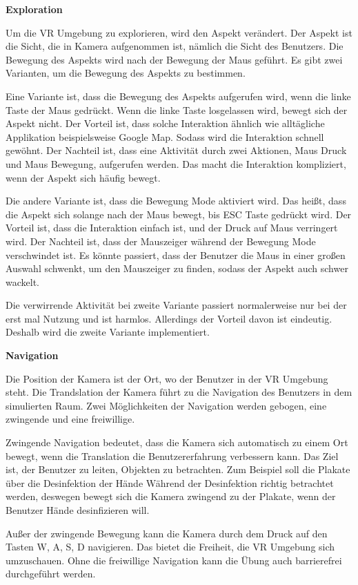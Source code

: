   \textbf{Exploration}
  
  Um die VR Umgebung zu explorieren, wird den Aspekt verändert. Der Aspekt ist die Sicht, die in Kamera aufgenommen ist, nämlich die Sicht des Benutzers. Die Bewegung des Aspekts wird nach der Bewegung der Maus geführt. Es gibt zwei Varianten, um die Bewegung des Aspekts zu bestimmen.
  
  Eine Variante ist, dass die Bewegung des Aspekts aufgerufen wird, wenn die linke Taste der Maus gedrückt. Wenn die linke Taste losgelassen wird, bewegt sich der Aspekt nicht. Der Vorteil ist, dass solche Interaktion ähnlich wie alltägliche Applikation beispielsweise Google Map. Sodass wird die Interaktion schnell gewöhnt. Der Nachteil ist, dass eine Aktivität durch zwei Aktionen, Maus Druck und Maus Bewegung, aufgerufen werden. Das macht die Interaktion kompliziert, wenn der Aspekt sich häufig bewegt.
  
  Die andere Variante ist, dass die Bewegung Mode aktiviert wird. Das heißt, dass die Aspekt sich solange nach der Maus bewegt, bis ESC Taste gedrückt wird. Der Vorteil ist, dass die Interaktion einfach ist, und der Druck auf Maus verringert wird. Der Nachteil ist, dass der Mauszeiger während der Bewegung Mode verschwindet ist. Es könnte passiert, dass der Benutzer die Maus in einer großen Auswahl schwenkt, um den Mauszeiger zu finden, sodass der Aspekt auch schwer wackelt.
  
  Die verwirrende Aktivität bei zweite Variante passiert normalerweise nur bei der erst mal Nutzung und ist harmlos. Allerdings der Vorteil davon ist eindeutig. Deshalb wird die zweite Variante implementiert.
  
  \textbf{Navigation}
  
  Die Position der Kamera ist der Ort, wo der Benutzer in der VR Umgebung steht. Die Trandslation der Kamera führt zu die Navigation des Benutzers in dem simulierten Raum. Zwei Möglichkeiten der Navigation werden gebogen, eine zwingende und eine freiwillige.
  
  Zwingende Navigation bedeutet, dass die Kamera sich automatisch zu einem Ort bewegt, wenn die Translation die Benutzererfahrung verbessern kann. Das Ziel ist, der Benutzer zu leiten, Objekten zu betrachten. Zum Beispiel soll die Plakate über die Desinfektion der Hände Während der Desinfektion richtig betrachtet werden, deswegen bewegt sich die Kamera zwingend zu der Plakate, wenn der Benutzer Hände desinfizieren will.

  Außer der zwingende Bewegung kann die Kamera durch dem Druck auf den Tasten W, A, S, D navigieren. Das bietet die Freiheit, die VR Umgebung sich umzuschauen. Ohne die freiwillige Navigation kann die Übung auch barrierefrei durchgeführt werden.
  
